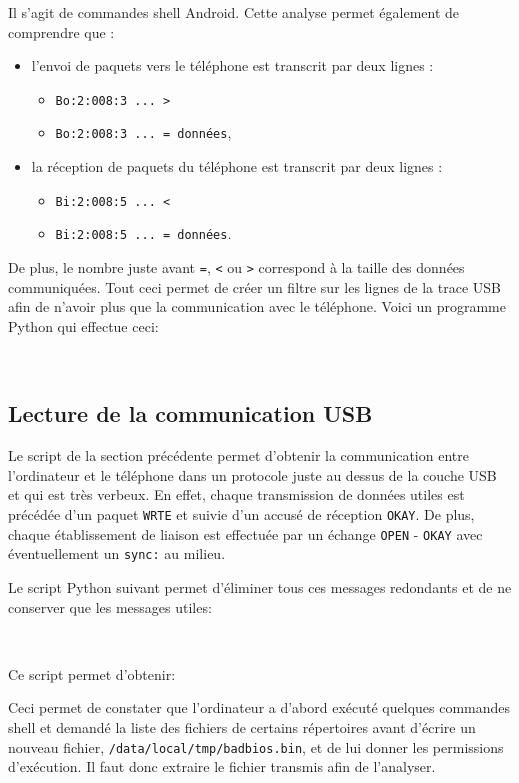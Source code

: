\documentclass[a4paper,10pt]{article}
\newcommand{\pyinput}[1]{%
    \noindent{\color[rgb]{0.5, 0.5, 0.5}{\rule{\textwidth}{0.4pt}}}
     \\
    \noindent{\color[rgb]{0.5, 0.5, 0.5}{\rule{\textwidth}{0.4pt}}}
}
\begin{document}
Il s'agit de commandes shell Android. Cette analyse permet également de comprendre que :
\begin{itemize}
\item l'envoi de paquets vers le téléphone est transcrit par deux lignes :
    \begin{itemize}
    \item \texttt{Bo:2:008:3 ... >}
    \item \texttt{Bo:2:008:3 ... = données},
    \end{itemize}
\item la réception de paquets du téléphone est transcrit par deux lignes :
    \begin{itemize}
    \item \texttt{Bi:2:008:5 ... <}
    \item \texttt{Bi:2:008:5 ... = données}.
    \end{itemize}
\end{itemize}

De plus, le nombre juste avant \texttt{=}, \texttt{<} ou \texttt{>} correspond à la taille des données communiquées. Tout ceci permet de créer un filtre sur les lignes de la trace USB afin de n'avoir plus que la communication avec le téléphone. Voici un programme Python qui effectue ceci:

\pyinput{1_usb/read_usbtrace.py.inc.tex}

\subsection{Lecture de la communication USB}

Le script de la section précédente permet d'obtenir la communication entre l'ordinateur et le téléphone dans un protocole juste au dessus de la couche USB et qui est très verbeux. En effet, chaque transmission de données utiles est précédée d'un paquet \texttt{WRTE} et suivie d'un accusé de réception \texttt{OKAY}. De plus, chaque établissement de liaison est effectuée par un échange \texttt{OPEN} - \texttt{OKAY} avec éventuellement un \texttt{sync:} au milieu.

Le script Python suivant permet d'éliminer tous ces messages redondants et de ne conserver que les messages utiles:

\pyinput{1_usb/read_androidcomm.py.inc.tex}

Ce script permet d'obtenir:


Ceci permet de constater que l'ordinateur a d'abord exécuté quelques commandes shell et demandé la liste des fichiers de certains répertoires avant d'écrire un nouveau fichier, \texttt{/data/local/tmp/badbios.bin}, et de lui donner les permissions d'exécution. Il faut donc extraire le fichier transmis afin de l'analyser.
\end{document}
